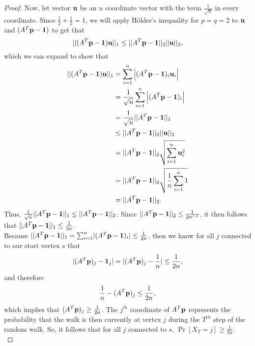 \documentclass[psamsfonts, 10pt]{amsart}
\theoremstyle{definition}
\theoremstyle{remark}
\numberwithin{equation}{section}
\begin{document}
\begin{proof}
Now, let vector ${\bf u}$ be an $n$ coordinate vector with the term $\frac{1}{\sqrt{n}}$ in every coordinate. Since $\frac{1}{2} + \frac{1}{2} = 1$, we will apply H\"older's inequality for $p = q = 2$ to ${\bf u}$ and $(A^T{\bf p} - {\bf 1})$ to get that 
\[
\lvert\lvert (A^T{\bf p} - {\bf 1}){\bf u}\rvert\rvert_1\leq \lvert \lvert A^T{\bf p} - {\bf 1} \rvert \rvert_{2} \lvert \lvert {\bf u}\rvert \rvert_{2},
\]
which we can expand to show that 
\[\begin{aligned}
\lvert\lvert (A^T{\bf p} - {\bf 1}){\bf u}\rvert\rvert_1 &= \sum_{i=1}^n \Big\lvert (A^T{\bf p} - {\bf 1})_i{\bf u}_i \Big\rvert\\
&= \frac{1}{\sqrt{n}}\sum_{i=1}^n \Big\lvert (A^T{\bf p} - {\bf 1})_i\Big\rvert\\
&= \frac{1}{\sqrt{n}}\lvert\lvert A^T{\bf p} - {\bf 1}\rvert\rvert_1 \\
&\leq \lvert \lvert A^T{\bf p} - {\bf 1} \rvert \rvert_{2} \lvert \lvert {\bf u}\rvert \rvert_{2}\\
&= \lvert \lvert A^T{\bf p} - {\bf 1} \rvert \rvert_{2} \sqrt{\sum_{i=1}^n {\bf u}_i^2} \\
&=  \lvert \lvert A^T{\bf p} - {\bf 1} \rvert \rvert_{2} \sqrt{\frac{1}{n}\sum_{i=1}^n 1}\\
&=  \lvert \lvert A^T{\bf p} - {\bf 1} \rvert \rvert_{2}.
\end{aligned}
\]
Thus, $\frac{1}{\sqrt{n}}\lvert\lvert A^T{\bf p} - {\bf 1}\rvert\rvert_1 \leq \lvert \lvert A^T{\bf p} - {\bf 1} \rvert \rvert_{2}$. Since $\lvert \lvert A^T{\bf p} - {\bf 1} \rvert \rvert_{2} \leq \frac{1}{2n^{1.5}}$, it then follows that $\lvert\lvert A^T{\bf p} - {\bf 1}\rvert\rvert_1 \leq \frac{1}{2n}$.\\

Because $\lvert\lvert A^T{\bf p} - {\bf 1}\rvert\rvert_1  = \sum_{i=1}^n \lvert (A^T{\bf p} - {\bf 1})_i\rvert \leq \frac{1}{2n}$, then we know for all $j$ connected to our start vertex $s$ that 
\[
\lvert( A^T{\bf p})_j - {\bf 1}_j \rvert = \lvert( A^T{\bf p})_j - \frac{1}{n} \rvert \leq \frac{1}{2n},
\]
and therefore
\[
\frac{1}{n} - (A^T{\bf p})_j \leq \frac{1}{2n},
\]
which implies that $(A^T{\bf p})_j \geq \frac{1}{2n}$. The $j^{th}$ coordinate of $A^T{\bf p}$ represents the probability that the walk is then currently at vertex $j$ during the $T^{th}$ step of the random walk. So, it follows that for all $j$ connected to $s$, $\Pr[X_T = j] \geq \frac{1}{2n}$.
\\
\end{proof}
\end{document}
